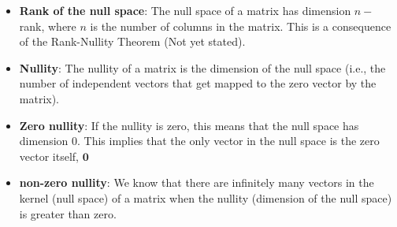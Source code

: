 \documentclass{report}
\begin{document}
\begin{itemize}
    \item \textbf{Rank of the null space}: The null space of a matrix has dimension $n-$rank, where $n$ is the number of columns in the matrix. This is a consequence of the Rank-Nullity Theorem (Not yet stated).
    \item \textbf{Nullity}: The nullity of a matrix is the dimension of the null space (i.e., the number of independent vectors that get mapped to the zero vector by the matrix).
    \item \textbf{Zero nullity}: If the nullity is zero, this means that the null space has dimension 0. This implies that the only vector in the null space is the zero vector itself, $\mathbf{0}$
    \item \textbf{non-zero nullity}: 
        We know that there are infinitely many vectors in the kernel (null space) of a matrix when the nullity (dimension of the null space) is greater than zero.

    \end{itemize}
\end{document}
